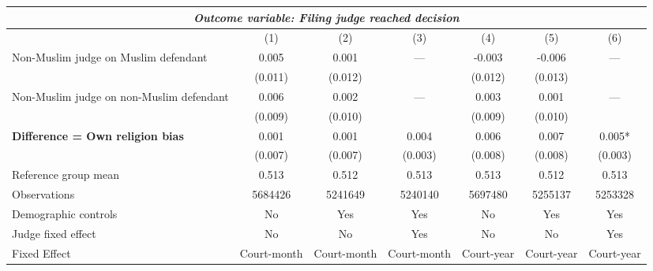 {
\def\sym#1{\ifmmode^{#1}\else\(^{#1}\)\fi}
\begin{tabular}{l*{6}{c}}
  \hline\hline
\multicolumn{7}{c}{\textit{Outcome variable: Filing judge reached decision}}\\
\hline
&\multicolumn{1}{c}{(1)}&\multicolumn{1}{c}{(2)}&\multicolumn{1}{c}{(3)}&\multicolumn{1}{c}{(4)}&\multicolumn{1}{c}{(5)}&\multicolumn{1}{c}{(6)}\\
\hline
Non-Muslim judge on Muslim defendant \hspace{15mm}& 0.005 & 0.001 & --- & -0.003 & -0.006 & --- \\
& (0.011) & (0.012) &  & (0.012) &(0.013) &  \\
Non-Muslim judge on non-Muslim defendant \hspace{15mm}& 0.006 & 0.002 & ---& 0.003 & 0.001 & --- \\
& (0.009) & (0.010) &  & (0.009) & (0.010) &  \\
\textbf{Difference = Own religion bias} & 0.001 & 0.001 & 0.004 & 0.006 & 0.007 & 0.005* \\
& (0.007) & (0.007) & (0.003) & (0.008) & (0.008) & (0.003) \\
\hline
Reference group mean & 0.513 & 0.512 & 0.513 & 0.513 & 0.512 & 0.513 \\
Observations & 5684426 & 5241649 & 5240140 & 5697480 & 5255137 & 5253328 \\
Demographic controls & No & Yes & Yes & No & Yes & Yes \\
Judge fixed effect & No & No & Yes & No & No & Yes \\
Fixed Effect & Court-month & Court-month & Court-month & Court-year & Court-year & Court-year \\
\hline\hline
\end{tabular}
}
 
